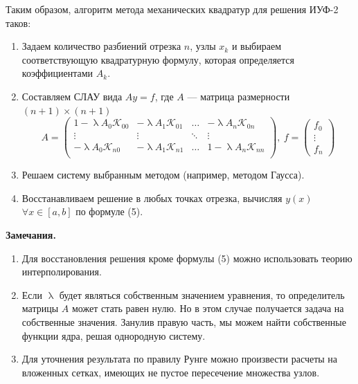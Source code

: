 \documentclass[a4paper, 12pt]{report}
\numberwithin{equation}{section}
\renewcommand{\lambda}{\uplambda}
\begin{document}
	Таким образом, алгоритм метода механических квадратур для решения ИУФ-2 таков:
	\begin{enumerate}
		\item Задаем количество разбиений отрезка $n$, узлы $x_k$ и выбираем соответствующую квадратурную формулу, которая определяется коэффициентами $A_k$.
		\item Составляем СЛАУ вида $Ay = f$, где $A$ --- матрица размерности $(n+1)\times( n+1)$
		$$A = \begin{pmatrix}
			1 - \lambda A_0 \mathcal K_{00} & -\lambda A_1 \mathcal K_{01} & \ldots & -\lambda A_n \mathcal K_{0n}\\
			\vdots & \vdots & \ddots & \vdots \\
			 - \lambda A_0 \mathcal K_{n0} & -\lambda A_1 \mathcal K_{n1} & \ldots & 1-\lambda A_n \mathcal K_{nn}\\
		\end{pmatrix},\ f= \begin{pmatrix}
		f_0 \\ \vdots \\ f_n
		\end{pmatrix}$$
		\item Решаем систему выбранным методом (например, методом Гаусса).
		\item Восстанавливаем решение в любых точках отрезка, вычисляя $y(x)$ $\forall x \in [a,b]$ по формуле (5).
 	\end{enumerate}
 	\textbf{Замечания.}
 	\begin{enumerate}
 		\item Для восстановления решения кроме формулы (5) можно использовать теорию интерполирования.
 		\item Если $\lambda$ будет являться собственным значением уравнения, то определитель матрицы $A$ может стать равен нулю. Но в этом случае получается задача на собственные значения. Занулив правую часть, мы можем найти собственные функции ядра, решая однородную систему.
 		\item Для уточнения результата по правилу Рунге можно произвести расчеты на вложенных сетках, имеющих не пустое пересечение множества узлов.
 	\end{enumerate}
\end{document}
